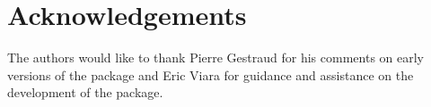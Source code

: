 \documentclass[article]{jss}
\begin{document}
\section[Acknowledgments]{Acknowledgements}

The authors would like to thank Pierre Gestraud for his comments on early
versions of the  package and Eric Viara for guidance and
assistance on the development of the  package.

%

\end{document}
